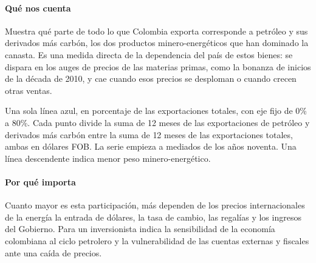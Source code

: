 \paragraph{Qué nos cuenta}
Muestra qué parte de todo lo que Colombia exporta corresponde a petróleo y sus derivados más carbón, los dos productos minero-energéticos que han dominado la canasta. Es una medida directa de la dependencia del país de estos bienes: se dispara en los auges de precios de las materias primas, como la bonanza de inicios de la década de 2010, y cae cuando esos precios se desploman o cuando crecen otras ventas.

\begin{leer}
Una sola línea azul, en porcentaje de las exportaciones totales, con eje fijo de 0\% a 80\%. Cada punto divide la suma de 12 meses de las exportaciones de petróleo y derivados más carbón entre la suma de 12 meses de las exportaciones totales, ambas en dólares FOB. La serie empieza a mediados de los años noventa. Una línea descendente indica menor peso minero-energético.
\end{leer}

\paragraph{Por qué importa}
Cuanto mayor es esta participación, más dependen de los precios internacionales de la energía la entrada de dólares, la tasa de cambio, las regalías y los ingresos del Gobierno. Para un inversionista indica la sensibilidad de la economía colombiana al ciclo petrolero y la vulnerabilidad de las cuentas externas y fiscales ante una caída de precios.

